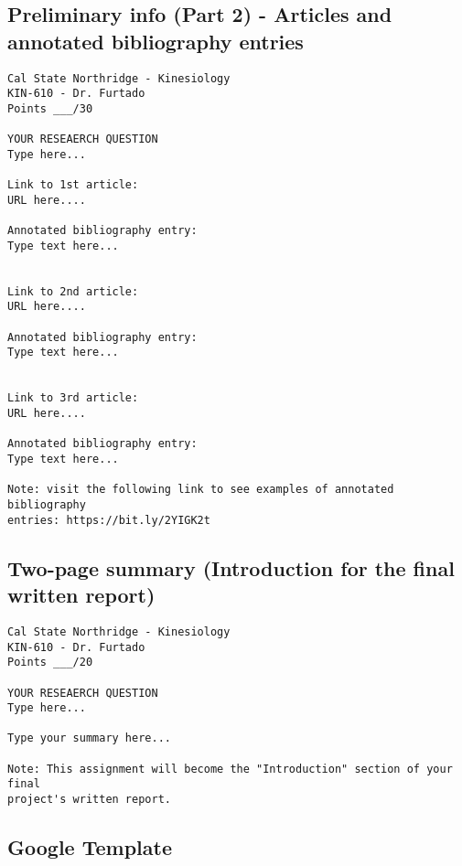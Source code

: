 \documentclass[
]{article}
\begin{document}
\hypertarget{preliminary-info-part-2---articles-and-annotated-bibliography-entries}{%
\subsection{Preliminary info (Part 2) - Articles and annotated bibliography entries}\label{preliminary-info-part-2---articles-and-annotated-bibliography-entries}}

\begin{verbatim}
Cal State Northridge - Kinesiology
KIN-610 - Dr. Furtado
Points ___/30

YOUR RESEAERCH QUESTION
Type here...

Link to 1st article:
URL here....

Annotated bibliography entry:
Type text here...


Link to 2nd article:
URL here....

Annotated bibliography entry:
Type text here...


Link to 3rd article:
URL here....

Annotated bibliography entry:
Type text here...

Note: visit the following link to see examples of annotated bibliography
entries: https://bit.ly/2YIGK2t
\end{verbatim}

\hypertarget{two-page-summary-introduction-for-the-final-written-report}{%
\subsection{Two-page summary (Introduction for the final written report)}\label{two-page-summary-introduction-for-the-final-written-report}}

\begin{verbatim}
Cal State Northridge - Kinesiology
KIN-610 - Dr. Furtado
Points ___/20

YOUR RESEAERCH QUESTION
Type here...

Type your summary here...

Note: This assignment will become the "Introduction" section of your final 
project's written report.
\end{verbatim}

\hypertarget{google-template}{%
\subsection{Google Template}\label{google-template}}
\end{document}
